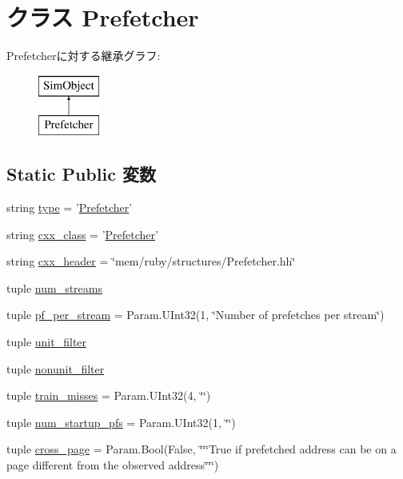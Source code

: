 \hypertarget{classRubyPrefetcher_1_1Prefetcher}{
\section{クラス Prefetcher}
\label{classRubyPrefetcher_1_1Prefetcher}
}
Prefetcherに対する継承グラフ:\begin{figure}[H]
\begin{center}
\leavevmode
\includegraphics[height=2cm]{classRubyPrefetcher_1_1Prefetcher}
\end{center}
\end{figure}
\subsection*{Static Public 変数}
\begin{DoxyCompactItemize}
\item 
string \hyperlink{classRubyPrefetcher_1_1Prefetcher_acce15679d830831b0bbe8ebc2a60b2ca}{type} = '\hyperlink{classRubyPrefetcher_1_1Prefetcher}{Prefetcher}'
\item 
string \hyperlink{classRubyPrefetcher_1_1Prefetcher_a58cd55cd4023648e138237cfc0822ae3}{cxx\_\-class} = '\hyperlink{classRubyPrefetcher_1_1Prefetcher}{Prefetcher}'
\item 
string \hyperlink{classRubyPrefetcher_1_1Prefetcher_a17da7064bc5c518791f0c891eff05fda}{cxx\_\-header} = \char`\"{}mem/ruby/structures/Prefetcher.hh\char`\"{}
\item 
tuple \hyperlink{classRubyPrefetcher_1_1Prefetcher_a4bdf506982ffaa0f791efff98d8dac94}{num\_\-streams}
\item 
tuple \hyperlink{classRubyPrefetcher_1_1Prefetcher_a29fdb5ede5ece37a3ab1ab48eaa53844}{pf\_\-per\_\-stream} = Param.UInt32(1, \char`\"{}Number of prefetches per stream\char`\"{})
\item 
tuple \hyperlink{classRubyPrefetcher_1_1Prefetcher_a79ff24e979a6e9ad98a225a5e3f26e76}{unit\_\-filter}
\item 
tuple \hyperlink{classRubyPrefetcher_1_1Prefetcher_aab2387f276e44f6e43f11aacec71a559}{nonunit\_\-filter}
\item 
tuple \hyperlink{classRubyPrefetcher_1_1Prefetcher_ac72f54c0da25cca5d7b9c1e9c7310f9d}{train\_\-misses} = Param.UInt32(4, \char`\"{}\char`\"{})
\item 
tuple \hyperlink{classRubyPrefetcher_1_1Prefetcher_ae574bd0a6c875f2e802a7ae689a25a4e}{num\_\-startup\_\-pfs} = Param.UInt32(1, \char`\"{}\char`\"{})
\item 
tuple \hyperlink{classRubyPrefetcher_1_1Prefetcher_a40f230330015dac14646c169c21a4c9c}{cross\_\-page} = Param.Bool(False, \char`\"{}\char`\"{}\char`\"{}True if prefetched address can be on a page different from the observed address\char`\"{}\char`\"{}\char`\"{})
\end{DoxyCompactItemize}


